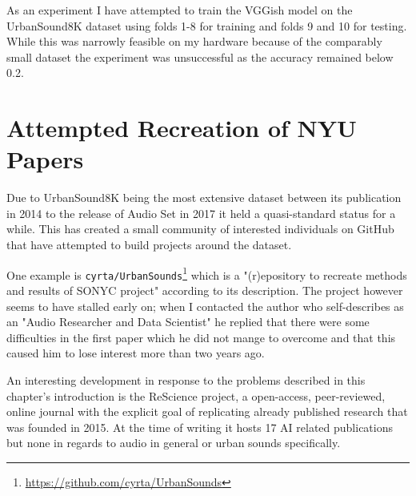 As an experiment I have attempted to train the VGGish model on the UrbanSound8K dataset using folds 1-8 for training and folds 9 and 10 for testing. While this was narrowly feasible on my hardware because of the comparably small dataset the experiment was unsuccessful as the accuracy remained below 0.2.







\section{Attempted Recreation of NYU Papers}


Due to UrbanSound8K being the most extensive dataset between its publication in 2014 to the release of Audio Set in 2017 it held a quasi-standard status for a while. This has created a small community of interested individuals on GitHub that have attempted to build projects around the dataset.

One example is \texttt{cyrta/UrbanSounds}\footnote{\url{https://github.com/cyrta/UrbanSounds}} which is a "(r)epository to recreate methods and results of SONYC project" according to its description. The project however seems to have stalled early on; when I contacted the author who self-describes as an "Audio Researcher and Data Scientist" he replied that there were some difficulties in the first paper which he did not mange to overcome and that this caused him to lose interest more than two years ago.



An interesting development in response to the problems described in this chapter's introduction is the ReScience project, a open-access, peer-reviewed, online journal with the explicit goal of replicating already published research that was founded in 2015. At the time of writing it hosts 17 AI related publications but none in regards to audio in general or urban sounds specifically.

